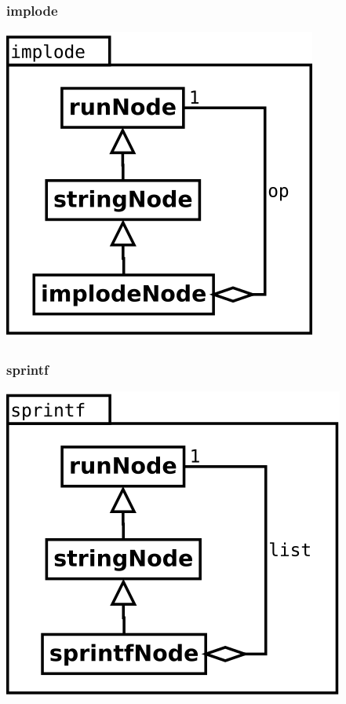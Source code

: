 \subsubsection {implode}
\begin{center}
\includegraphics[scale=0.4]{implode.png} \\
\end{center}

\subsubsection {sprintf}
\begin{center}
\includegraphics[scale=0.4]{sprintf.png} \\
\end{center}

